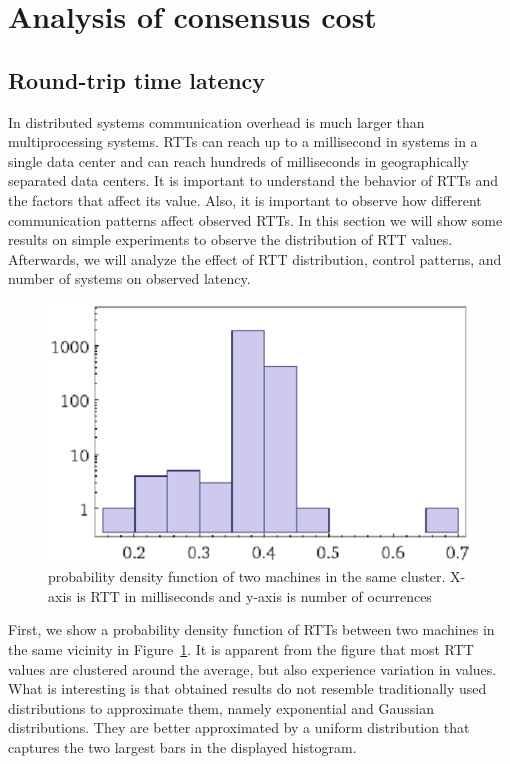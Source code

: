 \section{Analysis of consensus cost}\label{sec:analysis}


\subsection{Round-trip time latency}
In distributed systems communication overhead is much larger than multiprocessing systems. RTTs can reach up to a millisecond in systems in a single data center and can reach hundreds of milliseconds in geographically separated data centers. It is important to understand the behavior of RTTs and the factors that affect its value. Also, it is important to observe how different communication patterns affect observed RTTs. In this section we will show some results on simple experiments to observe the distribution of RTT values. Afterwards, we will analyze the effect of RTT distribution, control patterns, and number of systems on observed latency.

\begin{figure}[h]
\centering
\includegraphics[scale=0.5]{img/rttpdf2.eps}
\caption{probability density function of two machines in the same cluster. X-axis is RTT in milliseconds and y-axis is number of ocurrences}
\label{fig:rttpdf}
\end{figure}

First, we show a probability density function of RTTs between two machines in the same vicinity in Figure~\ref{fig:rttpdf}. It is apparent from the figure that most RTT values are clustered around the average, but also experience variation in values. What is interesting is that obtained results do not resemble traditionally used distributions to approximate them, namely exponential and Gaussian distributions. They are better approximated by a uniform distribution that captures the two largest bars in the displayed histogram.

